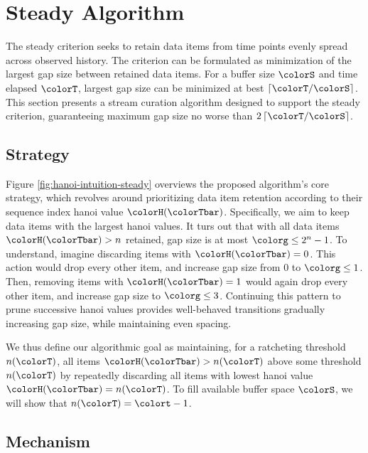 \section{Steady Algorithm} \label{sec:steady}

The steady criterion seeks to retain data items from time points evenly spread across observed history.
The criterion can be formulated as minimization of the largest gap size between retained data items.
For a buffer size $\colorS$ and time elapsed $\colorT$, largest gap size can be minimized at best $\left\lceil \colorT / \colorS \right\rceil$.
This section presents a stream curation algorithm designed to support the steady criterion, guaranteeing maximum gap size no worse than $2\left\lceil \colorT / \colorS \right\rceil$.

\subsection{Strategy}

Figure \ref{fig:hanoi-intuition-steady} overviews the proposed algorithm's core strategy, which revolves around prioritizing data item retention according to their sequence index hanoi value $\colorH(\colorTbar)$.
Specifically, we aim to keep data items with the largest hanoi values.
It turs out that with all data items $\colorH(\colorTbar) > n$ retained, gap size is at most $\colorg \leq 2^n - 1$.
To understand, imagine discarding items with $\colorH(\colorTbar) = 0$.
This action would drop every other item, and increase gap size from 0 to $\colorg \leq 1$.
Then, removing items with $\colorH(\colorTbar) = 1$ would again drop every other item, and increase gap size to $\colorg \leq 3$.
Continuing this pattern to prune successive hanoi values provides well-behaved transitions gradually increasing gap size, while maintaining even spacing.

We thus define our algorithmic goal as maintaining, for a ratcheting threshold $n(\colorT)$, all items $\colorH(\colorTbar) > n(\colorT)$ above some threshold $n(\colorT)$ by repeatedly discarding all items with lowest hanoi value $\colorH(\colorTbar) = n(\colorT)$.
To fill available buffer space $\colorS$, we will show that $n(\colorT) = \colort - 1$.



\subsection{Mechanism}


